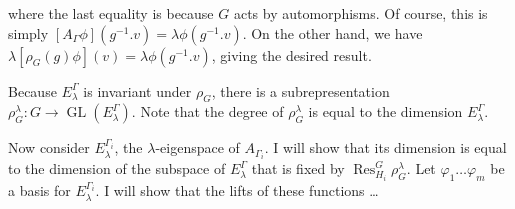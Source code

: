 where the last equality is because $G$ acts by automorphisms. Of course, this is simply $[A_\Gamma \phi](g^{-1}.v) = \lambda \phi(g^{-1}.v)$. On the other hand, we have $\lambda [\rho_G(g)\phi](v) = \lambda \phi(g^{-1}.v)$, giving the desired result.

Because $E_{\lambda}^{\Gamma}$ is invariant under $\rho_G$, there is a subrepresentation $\rho_G^\lambda : G \to \operatorname{GL}(E_{\lambda}^{\Gamma})$. Note that the degree of $\rho_G^\lambda$ is equal to the dimension $E_{\lambda}^{\Gamma}$. 

Now consider $E_{\lambda}^{\Gamma_i}$, the $\lambda$-eigenspace of $A_{\Gamma_i}$. I will show that its dimension is equal to the dimension of the subspace of $E_{\lambda}^{\Gamma}$ that is fixed by $\operatorname{Res}_{H_i}^G \rho_G^\lambda$. Let $\varphi_1 \ldots \varphi_m$ be a basis for $E_{\lambda}^{\Gamma_i}$. I will show that the lifts of these functions \ldots